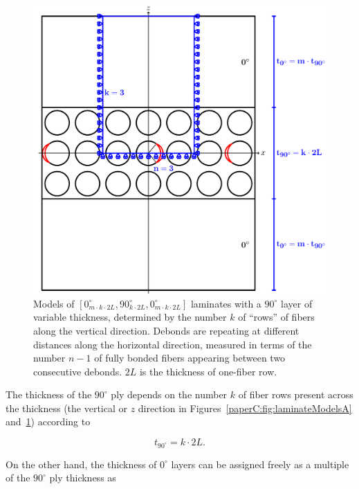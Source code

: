 \begin{figure}[!htb]
\centering
        \includegraphics[width=\textwidth]{paperC/ThickPly.pdf}
\caption{Models of $\left[0_{m\cdot k\cdot2L}^{\circ},90_{k\cdot2L}^{\circ},0_{m\cdot k\cdot2L}^{\circ}\right]$ laminates with a $90^{\circ}$ layer of variable thickness, determined by the number $k$ of ``rows'' of fibers along the vertical direction.  Debonds are repeating at different distances along the horizontal direction, measured in terms of the number $n-1$ of fully bonded fibers appearing between two consecutive debonds. $2L$ is the thickness of one-fiber row.}\label{paperC:fig:laminateModelsB}
\end{figure}

The thickness of the $90^{\circ}$ ply depends on the number $k$ of fiber rows present across the thickness (the vertical or $z$ direction in Figures~\ref{paperC:fig:laminateModelsA} and~\ref{paperC:fig:laminateModelsB}) according to

\begin{equation}\label{paperC:eq:t90}
t_{90^{\circ}}=k\cdot2L.
\end{equation}

On the other hand, the thickness of $0^{\circ}$ layers can be assigned freely as a multiple of the $90^{\circ}$ ply thickness as

